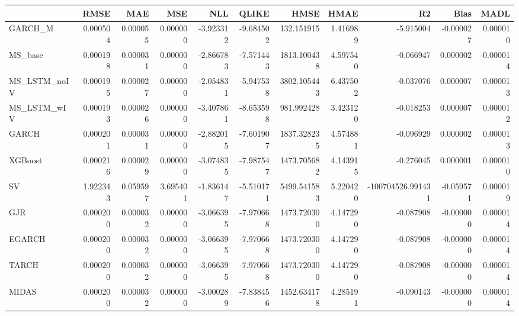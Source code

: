 \begin{tabular}{lrrrrrrrrrr}
\toprule
 & RMSE & MAE & MSE & NLL & QLIKE & HMSE & HMAE & R2 & Bias & MADL \\
\midrule
GARCH_M & 0.000504 & 0.000055 & 0.000000 & -3.923312 & -9.684502 & 132.151915 & 1.416989 & -5.915004 & -0.000027 & 0.000010 \\
MS_base & 0.000198 & 0.000031 & 0.000000 & -2.866783 & -7.571443 & 1813.100438 & 4.597540 & -0.066947 & 0.000002 & 0.000014 \\
MS_LSTM_noIV & 0.000195 & 0.000027 & 0.000000 & -2.054831 & -5.947538 & 3802.105443 & 6.437502 & -0.037076 & 0.000007 & 0.000013 \\
MS_LSTM_wIV & 0.000193 & 0.000026 & 0.000000 & -3.407861 & -8.653598 & 981.992428 & 3.423120 & -0.018253 & 0.000007 & 0.000012 \\
GARCH & 0.000201 & 0.000031 & 0.000000 & -2.882015 & -7.601907 & 1837.328235 & 4.574881 & -0.096929 & 0.000002 & 0.000013 \\
XGBoost & 0.000216 & 0.000029 & 0.000000 & -3.074835 & -7.987547 & 1473.705682 & 4.143915 & -0.276045 & 0.000001 & 0.000010 \\
SV & 1.922343 & 0.059597 & 3.695401 & -1.836147 & -5.510171 & 5499.541583 & 5.220420 & -100704526.991431 & -0.059571 & 0.000019 \\
GJR & 0.000200 & 0.000032 & 0.000000 & -3.066395 & -7.970668 & 1473.720300 & 4.147290 & -0.087908 & -0.000000 & 0.000014 \\
EGARCH & 0.000200 & 0.000032 & 0.000000 & -3.066395 & -7.970668 & 1473.720300 & 4.147290 & -0.087908 & -0.000000 & 0.000014 \\
TARCH & 0.000200 & 0.000032 & 0.000000 & -3.066395 & -7.970668 & 1473.720300 & 4.147290 & -0.087908 & -0.000000 & 0.000014 \\
MIDAS & 0.000200 & 0.000032 & 0.000000 & -3.000289 & -7.838456 & 1452.634178 & 4.285191 & -0.090143 & -0.000000 & 0.000014 \\
\bottomrule
\end{tabular}
